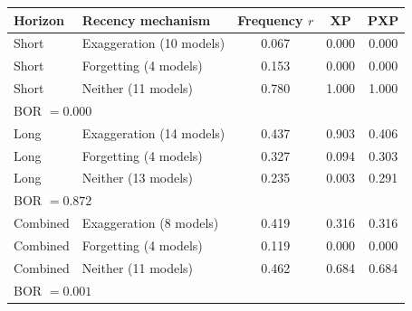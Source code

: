 \begin{tabular}{llccc}
\toprule
Horizon & Recency mechanism & Frequency $r$ & XP & PXP \\
\midrule
Short & Exaggeration (10 models) & 0.067 & 0.000 & 0.000 \\
Short & Forgetting (4 models) & 0.153 & 0.000 & 0.000 \\
Short & Neither (11 models) & 0.780 & 1.000 & 1.000 \\
\multicolumn{5}{l}{\quad\footnotesize BOR $= 0.000$} \\
\midrule
Long & Exaggeration (14 models) & 0.437 & 0.903 & 0.406 \\
Long & Forgetting (4 models) & 0.327 & 0.094 & 0.303 \\
Long & Neither (13 models) & 0.235 & 0.003 & 0.291 \\
\multicolumn{5}{l}{\quad\footnotesize BOR $= 0.872$} \\
\midrule
Combined & Exaggeration (8 models) & 0.419 & 0.316 & 0.316 \\
Combined & Forgetting (4 models) & 0.119 & 0.000 & 0.000 \\
Combined & Neither (11 models) & 0.462 & 0.684 & 0.684 \\
\multicolumn{5}{l}{\quad\footnotesize BOR $= 0.001$} \\
\bottomrule
\end{tabular}
